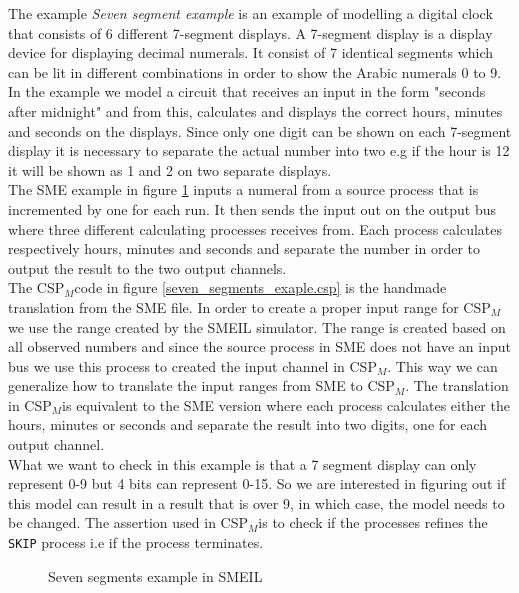 \documentclass[a4paper]{report}
\newcommand{\cspm}{CSP$_M$}
\begin{document}
The example \textit{Seven segment example} is an example of modelling a digital clock that consists of 6 different 7-segment displays. A 7-segment display is a display device for displaying decimal numerals. It consist of 7 identical segments which can be lit in different combinations in order to show the Arabic numerals 0 to 9. In the example we model a circuit that receives an input in the form "seconds after midnight" and from this, calculates and displays the correct hours, minutes and seconds on the displays. Since only one digit can be shown on each 7-segment display it is necessary to separate the actual number into two e.g if the hour is 12 it will be shown as 1 and 2 on two separate displays. \\ The SME example in figure \ref{seven_segments_exaple.sme} inputs a numeral from a source process that is incremented by one for each run. It then sends the input out on the output bus where three different calculating processes receives from. Each process calculates respectively hours, minutes and seconds and separate the number in order to output the result to the two output channels. \\ The \cspm code in figure \ref{seven_segments_exaple.csp} is the handmade translation from the SME file. 
In order to create a proper input range for \cspm we use the range created by the SMEIL simulator. The range is created based on all observed numbers and since the source process in SME does not have an input bus we use this process to created the input channel in \cspm. This way we can generalize how to translate the input ranges from SME to \cspm. The translation in \cspm is equivalent to the SME version where each process calculates either the hours, minutes or seconds and separate the result into two digits, one for each output channel.\\ What we want to check in this example is that a 7 segment display can only represent 0-9 but 4 bits can represent 0-15. So we are interested in figuring out if this model can result in a result that is over 9, in which case, the model needs to be changed. The assertion used in \cspm is to check if the processes refines the \texttt{SKIP} process i.e if the process terminates. 

\begin{figure}
\label{seven_segments_exaple.sme}
\caption{Seven segments example in SMEIL}
\end{figure}
\end{document}
